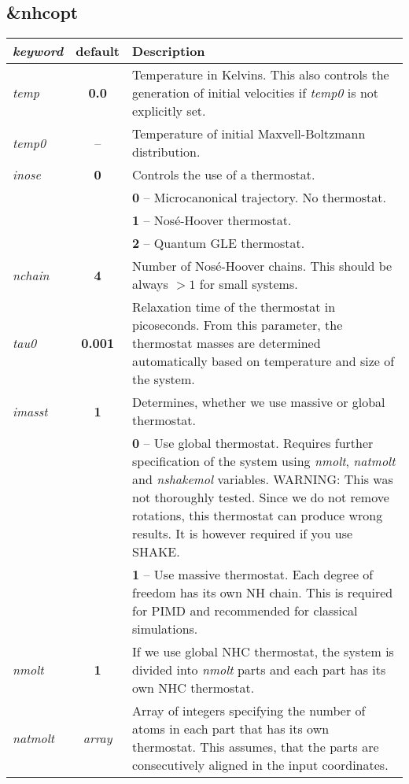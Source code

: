 \subsection{\&nhcopt}
\begin{tabularx}{\textwidth}{lcX}
\textit{keyword} & \textbf{default} & Description \\
\hline
\textit{temp} & \textbf{0.0} &  Temperature in Kelvins.
This also controls the generation of initial velocities if \textit{temp0} is not explicitly set. \\ 
\textit{temp0} & -- &  Temperature of initial Maxvell-Boltzmann distribution. \\
\textit{inose} & \textbf{0} &  Controls the use of a thermostat. \\
& & \textbf{0} -- Microcanonical trajectory. No thermostat. \\
& & \textbf{1} -- Nos\'{e}-Hoover thermostat.\\
& & \textbf{2} -- Quantum GLE thermostat.\\


\textit{nchain} & \textbf{4} & Number of Nos\'{e}-Hoover chains. This should be always $>1$ for small systems. \\

\textit{tau0} & \textbf{0.001} & Relaxation time of the thermostat in picoseconds. From this parameter, 
the thermostat masses are determined automatically based on temperature and size of the system.\cite{Tuckerman_book} \\

\textit{imasst} & \textbf{1} & Determines, whether we use massive or global thermostat. \\
& & \textbf{0} -- Use global thermostat.
Requires further specification of the system using \textit{nmolt}, \textit{natmolt} and \textit{nshakemol} variables.
WARNING: This was not thoroughly tested.
Since we do not remove rotations, this thermostat can produce wrong results. It is however required if you use SHAKE.\\
& & \textbf{1} -- Use massive thermostat. Each degree of freedom has its own NH chain.
This is required for PIMD and recommended for classical simulations. \\

\textit{nmolt} & \textbf{1} & If we use global NHC thermostat, the system is divided into \textit{nmolt} parts
and each part has its own NHC thermostat. \\

\textit{natmolt} & \textit{array}& Array of integers specifying the number of atoms in each part that has its own thermostat.
This assumes, that the parts are consecutively aligned in the input coordinates.  \\


\end{tabularx}
